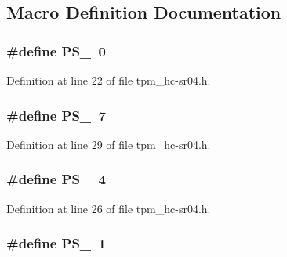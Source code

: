 \subsection{Macro Definition Documentation}
\subsubsection[{\texorpdfstring{P\+S\+\_\+1}{PS_1}}]{\setlength{\rightskip}{0pt plus 5cm}\#define P\+S\+\_~0}\hypertarget{tpm__hc-sr04_8h_af8c1cc647ec92ffbf73384c2b1d3b1d1}{}\label{tpm__hc-sr04_8h_af8c1cc647ec92ffbf73384c2b1d3b1d1}


Definition at line 22 of file tpm\+\_\+hc-\/sr04.\+h.

\subsubsection[{\texorpdfstring{P\+S\+\_\+128}{PS_128}}]{\setlength{\rightskip}{0pt plus 5cm}\#define P\+S\+\_~7}\hypertarget{tpm__hc-sr04_8h_a8862127136c67058e7bf4007646bb68d}{}\label{tpm__hc-sr04_8h_a8862127136c67058e7bf4007646bb68d}


Definition at line 29 of file tpm\+\_\+hc-\/sr04.\+h.

\subsubsection[{\texorpdfstring{P\+S\+\_\+16}{PS_16}}]{\setlength{\rightskip}{0pt plus 5cm}\#define P\+S\+\_~4}\hypertarget{tpm__hc-sr04_8h_aaf52372f79355a3c831511b2fea947ee}{}\label{tpm__hc-sr04_8h_aaf52372f79355a3c831511b2fea947ee}


Definition at line 26 of file tpm\+\_\+hc-\/sr04.\+h.

\subsubsection[{\texorpdfstring{P\+S\+\_\+2}{PS_2}}]{\setlength{\rightskip}{0pt plus 5cm}\#define P\+S\+\_~1}\hypertarget{tpm__hc-sr04_8h_a9c0f90cb04742b102df8cf778e167d73}{}\label{tpm__hc-sr04_8h_a9c0f90cb04742b102df8cf778e167d73}


